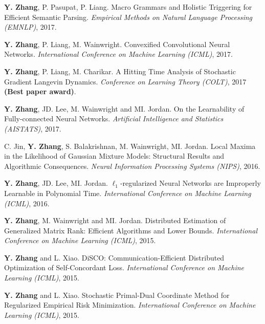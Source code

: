 \documentclass{res}
\begin{document}
\begin{resume}
\begin{enumerate}[label={[C\arabic*]}, ref={C\arabic*}]
\item  \textbf{Y. Zhang}, P. Pasupat, P. Liang. Macro Grammars and Holistic Triggering for Efficient Semantic Parsing.
\emph{Empirical Methods on Natural Language Processing (EMNLP)}, 2017. \label{macro-emnlp17}

\item  \textbf{Y. Zhang}, P. Liang, M. Wainwright. Convexified Convolutional Neural Networks.
\emph{International Conference on Machine Learning (ICML)}, 2017. \label{convexified-icml17}

\item  \textbf{Y. Zhang}, P. Liang, M. Charikar. A Hitting Time Analysis of Stochastic Gradient Langevin Dynamics.
\emph{Conference on Learning Theory (COLT)}, 2017 {\bf (Best paper award)}. \label{a-hitting-colt17}

\item \textbf{Y. Zhang}, JD. Lee, M. Wainwright and MI. Jordan. On the Learnability of Fully-connected Neural Networks.
\emph{Artificial Intelligence and Statistics (AISTATS)}, 2017. \label{on-the-learnability-aistats17}

\item C. Jin, {\bf Y. Zhang}, S. Balakrishnan, M. Wainwright, MI. Jordan.  
Local Maxima in the Likelihood of Gaussian Mixture Models: Structural Results and Algorithmic Consequences.
\emph{Neural Information Processing Systems (NIPS)}, 2016. \label{local-nips16}

\item \textbf{Y. Zhang}, JD. Lee, MI. Jordan. $\ell_1$-regularized Neural Networks are Improperly Learnable in Polynomial Time.
\emph{International Conference on Machine Learning (ICML)}, 2016. \label{l1-icml16}

\item \textbf{Y. Zhang}, M. Wainwright and MI. Jordan. Distributed Estimation of Generalized Matrix Rank: Efficient Algorithms and Lower Bounds.
\emph{International Conference on Machine Learning (ICML)}, 2015. \label{distributed-icml15}

\item \textbf{Y. Zhang} and L. Xiao. DiSCO: Communication-Efficient Distributed Optimization of Self-Concordant Loss.
\emph{International Conference on Machine Learning (ICML)}, 2015. \label{communication-icml15}

\item \textbf{Y. Zhang} and L. Xiao. Stochastic Primal-Dual Coordinate Method for Regularized Empirical Risk Minimization.
\emph{International Conference on Machine Learning (ICML)}, 2015.\label{stochastic-icml15}


\end{enumerate}
\end{resume}
\end{document}
